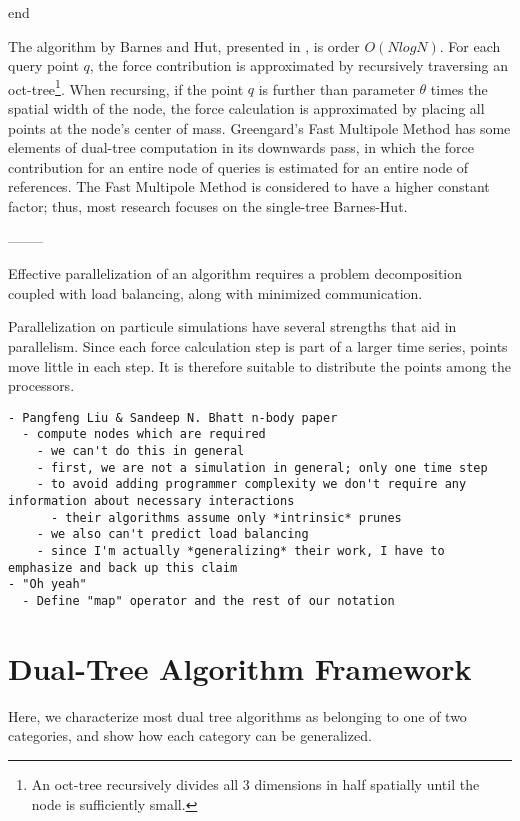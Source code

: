 \documentclass[times, 10pt,twocolumn]{article}
\begin{document}
end

The algorithm by Barnes and Hut, presented in \cite{barneshut}, is order $O(N log N)$.
For each query point $q$, the force contribution is approximated by recursively traversing an oct-tree\footnote{An oct-tree recursively divides all 3 dimensions in half spatially until the node is sufficiently small.}.
When recursing, if the point $q$ is further than parameter $\theta$ times the spatial width of the node, the force calculation is approximated by placing all points at the node's center of mass.
Greengard's Fast Multipole Method \cite{greengard_fmm} has some elements of dual-tree computation in its downwards pass, in which the force contribution for an entire node of queries is estimated for an entire node of references.
The Fast Multipole Method is considered to have a higher constant factor; thus, most research focuses on the single-tree Barnes-Hut\cite{fmm_slower}.

--------

Effective parallelization of an algorithm requires a problem decomposition coupled with load balancing, along with minimized communication.

Parallelization on particule simulations have several strengths that aid in parallelism.
Since each force calculation step is part of a larger time series, points move little in each step.
It is therefore suitable to distribute the points among the processors.

\begin{verbatim}
- Pangfeng Liu & Sandeep N. Bhatt n-body paper
  - compute nodes which are required
    - we can't do this in general
    - first, we are not a simulation in general; only one time step
    - to avoid adding programmer complexity we don't require any information about necessary interactions
      - their algorithms assume only *intrinsic* prunes
    - we also can't predict load balancing
    - since I'm actually *generalizing* their work, I have to emphasize and back up this claim
- "Oh yeah"
  - Define "map" operator and the rest of our notation
\end{verbatim}

\section{Dual-Tree Algorithm Framework}

Here, we characterize most dual tree algorithms as belonging to one of two categories, and show how each category can be generalized.
\end{document}
